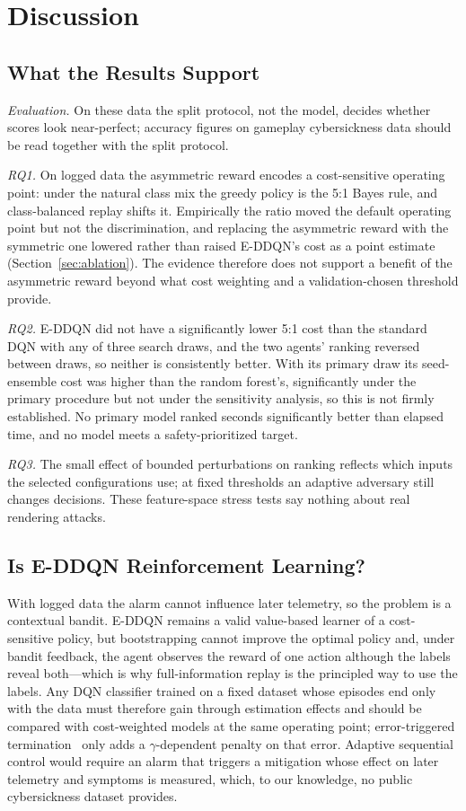 \section{Discussion}
\label{sec:discussion}

\subsection{What the Results Support}
\emph{Evaluation.} On these data the split protocol, not the model, decides whether scores look near-perfect; accuracy figures on gameplay cybersickness data should be read together with the split protocol.

\emph{RQ1.} On logged data the asymmetric reward encodes a cost-sensitive operating point: under the natural class mix the greedy policy is the 5:1 Bayes rule, and class-balanced replay shifts it. Empirically the ratio moved the default operating point but not the discrimination, and replacing the asymmetric reward with the symmetric one lowered rather than raised E-DDQN's cost as a point estimate (Section~\ref{sec:ablation}). The evidence therefore does not support a benefit of the asymmetric reward beyond what cost weighting and a validation-chosen threshold provide.

\emph{RQ2.} E-DDQN did not have a significantly lower 5:1 cost than the standard DQN with any of three search draws, and the two agents' ranking reversed between draws, so neither is consistently better. With its primary draw its seed-ensemble cost was higher than the random forest's, significantly under the primary procedure but not under the sensitivity analysis, so this is not firmly established. No primary model ranked seconds significantly better than elapsed time, and no model meets a safety-prioritized target.

\emph{RQ3.} The small effect of bounded perturbations on ranking reflects which inputs the selected configurations use; at fixed thresholds an adaptive adversary still changes decisions. These feature-space stress tests say nothing about real rendering attacks.

\subsection{Is E-DDQN Reinforcement Learning?}
With logged data the alarm cannot influence later telemetry, so the problem is a contextual bandit. E-DDQN remains a valid value-based learner of a cost-sensitive policy, but bootstrapping cannot improve the optimal policy and, under bandit feedback, the agent observes the reward of one action although the labels reveal both---which is why full-information replay is the principled way to use the labels. Any DQN classifier trained on a fixed dataset whose episodes end only with the data must therefore gain through estimation effects and should be compared with cost-weighted models at the same operating point; error-triggered termination~\cite{lin2020imbalanced,yang2024drlimbalanced} only adds a $\gamma$-dependent penalty on that error. Adaptive sequential control would require an alarm that triggers a mitigation whose effect on later telemetry and symptoms is measured, which, to our knowledge, no public cybersickness dataset provides.

